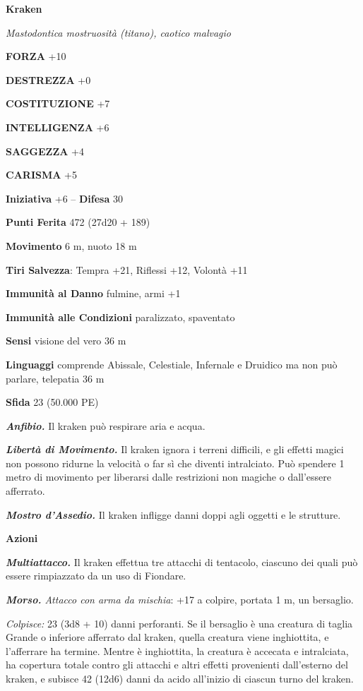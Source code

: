 \begin{multicols}{2}
\medskip{}\textbf{Kraken}

\emph{Mastodontica mostruosità (titano), caotico malvagio}

\textbf{FORZA} +10

\textbf{DESTREZZA} +0

\textbf{COSTITUZIONE} +7

\textbf{INTELLIGENZA} +6

\textbf{SAGGEZZA} +4

\textbf{CARISMA} +5

\textbf{Iniziativa} +6 -- \textbf{Difesa} 30

\textbf{Punti Ferita} 472 (27d20 + 189)

\textbf{Movimento} 6 m, nuoto 18 m

\textbf{Tiri Salvezza}: Tempra +21, Riflessi +12, Volontà +11

\textbf{Immunità al Danno} fulmine, armi +1

\textbf{Immunità alle Condizioni} paralizzato, spaventato

\textbf{Sensi} visione del vero 36 m 

\textbf{Linguaggi} comprende Abissale, Celestiale, Infernale e Druidico ma non può parlare, telepatia 36 m 

\textbf{Sfida} 23 (50.000 PE)

\emph{\textbf{Anfibio.}} Il kraken può respirare aria e acqua.

\emph{\textbf{Libertà di Movimento.}} Il kraken ignora i terreni difficili, e gli effetti magici non possono ridurne la velocità o far sì che diventi intralciato. Può spendere 1 metro di movimento per liberarsi dalle restrizioni non magiche o dall'essere afferrato.

\emph{\textbf{Mostro d'Assedio.}} Il kraken infligge danni doppi agli oggetti e le strutture.

\textbf{Azioni}

\emph{\textbf{Multiattacco.}} Il kraken effettua tre attacchi di tentacolo, ciascuno dei quali può essere rimpiazzato da un uso di Fiondare.

\emph{\textbf{Morso.} Attacco con arma da mischia}: +17 a colpire, portata 1 m, un bersaglio.

\emph{Colpisce:} 23 (3d8 + 10) danni perforanti. Se il bersaglio è una creatura di taglia Grande o inferiore afferrato dal kraken, quella creatura viene inghiottita, e l'afferrare ha termine. Mentre è inghiottita, la creatura è accecata e intralciata, ha copertura totale contro gli attacchi e altri effetti provenienti dall'esterno del kraken, e subisce 42 (12d6) danni da acido all'inizio di ciascun turno del kraken.


\end{multicols}
